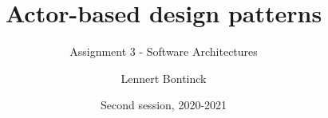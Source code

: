 \title{Actor-based design patterns}
\subtitle{Assignment 3 - Software Architectures}
\author{Lennert Bontinck}
\date{Second session, 2020-2021}
